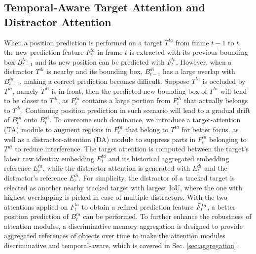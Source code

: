 \documentclass[final]{cvpr}
\begin{document}
\subsection{Temporal-Aware Target Attention and Distractor Attention}
\label{sec:tada}
When a position prediction is performed on a target \(T^{ta}\) from frame \(t-1\) to \(t\), the new prediction feature \(F^{ta}_t\) in frame \(t\) is extracted with its previous bounding box \(B^{ta}_{t-1}\) and its new position can be predicted with \(F^{ta}_t\). However, when a distractor \(T^{di}\) is nearby and its bounding box, \(B^{di}_{t-1}\) has a large overlap with \(B^{ta}_{t-1}\), making a correct prediction becomes difficult. Suppose \(T^{ta}\) is occluded by \(T^{di}\), namely \(T^{di}\) is in front, then the predicted new bounding box of \(T^{ta}\) will tend to be closer to \(T^{di}\), as \(F^{ta}_t\) contains a large portion from \(F^{di}_{t}\) that actually belongs to \(T^{di}\). Continuing position prediction in such scenario will lead to a gradual drift of \(B^{ta}_t\) onto \(B^{di}_t\). To overcome such dominance, we introduce a target-attention (TA) module to augment regions in \(F^{ta}_t\) that belong to \(T^{ta}\) for better focus, as well as a distractor-attention (DA) module to suppress parts in \(F^{ta}_t\) belonging to \(T^{di}\) to reduce interference. The target attention is computed between the target's latest raw identity embedding \(E^{ta}_t\) and its historical aggregated embedding reference \(E^{ta}_r\), while the distractor attention is generated with \(E^{di}_t\) and the distractor's reference \(E^{di}_r\).
For simplicity, the distractor of a tracked target is selected as another nearby tracked target with largest IoU, where the one with highest overlapping is picked in case of multiple distractors.
With the two attentions applied on \(F^{ta}_t\) to obtain a refined prediction feature  \(\Tilde{F}^{ta}_t\), a better position prediction of \(B^{ta}_t\) can be performed. To further enhance the robustness of attention modules, a discriminative memory aggregation is designed to provide aggregated references of objects over time to make the attention modules discriminative and temporal-aware, which is covered in Sec. \ref{sec:aggregation}.
\end{document}
